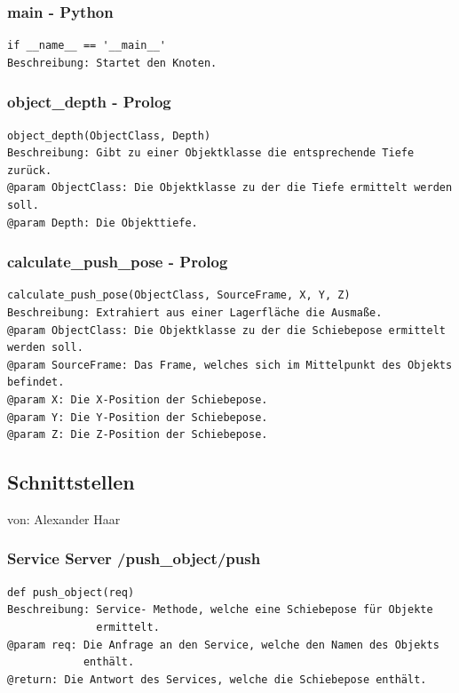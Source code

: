 \documentclass{suturo}
\makeatletter
\newcommand{\chapterauthor}[1]{%
  {\parindent0pt\vspace*{-27pt}%
  \linespread{0}\small\begin{flushright}von: #1\end{flushright}%
  \par\nobreak\vspace*{0pt}}
  \@afterheading%
}
\makeatother
\begin{document}
\subsubsection{main - Python}
\begin{verbatim}
if __name__ == '__main__'
Beschreibung: Startet den Knoten.
\end{verbatim}


\subsubsection{object\_depth - Prolog}
\begin{verbatim}
object_depth(ObjectClass, Depth)
Beschreibung: Gibt zu einer Objektklasse die entsprechende Tiefe zurück.
@param ObjectClass: Die Objektklasse zu der die Tiefe ermittelt werden soll.
@param Depth: Die Objekttiefe.
\end{verbatim}

\subsubsection{calculate\_push\_pose - Prolog}
\begin{verbatim}
calculate_push_pose(ObjectClass, SourceFrame, X, Y, Z)
Beschreibung: Extrahiert aus einer Lagerfläche die Ausmaße.
@param ObjectClass: Die Objektklasse zu der die Schiebepose ermittelt werden soll.
@param SourceFrame: Das Frame, welches sich im Mittelpunkt des Objekts befindet.
@param X: Die X-Position der Schiebepose.
@param Y: Die Y-Position der Schiebepose.
@param Z: Die Z-Position der Schiebepose.
\end{verbatim}

\subsection{Schnittstellen}
\chapterauthor{Alexander Haar}

\subsubsection{Service Server /push\_object/push}
\begin{verbatim}
def push_object(req)
Beschreibung: Service- Methode, welche eine Schiebepose für Objekte 
              ermittelt.
@param req: Die Anfrage an den Service, welche den Namen des Objekts 
            enthält.  
@return: Die Antwort des Services, welche die Schiebepose enthält.

\end{verbatim}
\end{document}
